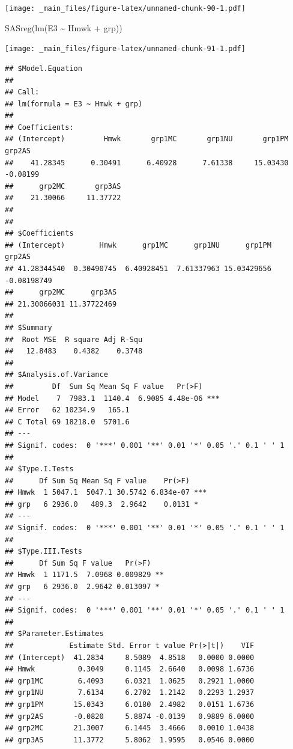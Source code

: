 \documentclass[
]{book}
\newenvironment{Shaded}{\begin{snugshade}}{\end{snugshade}}
\newcommand{\FunctionTok}[1]{\textcolor[rgb]{0.00,0.00,0.00}{#1}}
\newcommand{\NormalTok}[1]{#1}
\newcommand{\SpecialCharTok}[1]{\textcolor[rgb]{0.00,0.00,0.00}{#1}}
\begin{document}
\texttt{[image: \_main\_files/figure-latex/unnamed-chunk-90-1.pdf]}

\begin{Shaded}
\begin{Highlighting}[]
\FunctionTok{SASreg}\NormalTok{(}\FunctionTok{lm}\NormalTok{(E3 }\SpecialCharTok{\textasciitilde{}}\NormalTok{ Hmwk }\SpecialCharTok{+}\NormalTok{ grp))}
\end{Highlighting}
\end{Shaded}

\texttt{[image: \_main\_files/figure-latex/unnamed-chunk-91-1.pdf]}

\begin{verbatim}
## $Model.Equation
## 
## Call:
## lm(formula = E3 ~ Hmwk + grp)
## 
## Coefficients:
## (Intercept)         Hmwk       grp1MC       grp1NU       grp1PM       grp2AS  
##    41.28345      0.30491      6.40928      7.61338     15.03430     -0.08199  
##      grp2MC       grp3AS  
##    21.30066     11.37722  
## 
## 
## $Coefficients
## (Intercept)        Hmwk      grp1MC      grp1NU      grp1PM      grp2AS 
## 41.28344540  0.30490745  6.40928451  7.61337963 15.03429656 -0.08198749 
##      grp2MC      grp3AS 
## 21.30066031 11.37722469 
## 
## $Summary
##  Root MSE  R square Adj R-Squ 
##   12.8483    0.4382    0.3748 
## 
## $Analysis.of.Variance
##         Df  Sum Sq Mean Sq F value   Pr(>F)    
## Model    7  7983.1  1140.4  6.9085 4.48e-06 ***
## Error   62 10234.9   165.1                     
## C Total 69 18218.0  5701.6                     
## ---
## Signif. codes:  0 '***' 0.001 '**' 0.01 '*' 0.05 '.' 0.1 ' ' 1
## 
## $Type.I.Tests
##      Df Sum Sq Mean Sq F value    Pr(>F)    
## Hmwk  1 5047.1  5047.1 30.5742 6.834e-07 ***
## grp   6 2936.0   489.3  2.9642    0.0131 *  
## ---
## Signif. codes:  0 '***' 0.001 '**' 0.01 '*' 0.05 '.' 0.1 ' ' 1
## 
## $Type.III.Tests
##      Df Sum Sq F value   Pr(>F)   
## Hmwk  1 1171.5  7.0968 0.009829 **
## grp   6 2936.0  2.9642 0.013097 * 
## ---
## Signif. codes:  0 '***' 0.001 '**' 0.01 '*' 0.05 '.' 0.1 ' ' 1
## 
## $Parameter.Estimates
##             Estimate Std. Error t value Pr(>|t|)    VIF
## (Intercept)  41.2834     8.5089  4.8518   0.0000 0.0000
## Hmwk          0.3049     0.1145  2.6640   0.0098 1.6736
## grp1MC        6.4093     6.0321  1.0625   0.2921 1.0000
## grp1NU        7.6134     6.2702  1.2142   0.2293 1.2937
## grp1PM       15.0343     6.0180  2.4982   0.0151 1.6736
## grp2AS       -0.0820     5.8874 -0.0139   0.9889 6.0000
## grp2MC       21.3007     6.1445  3.4666   0.0010 1.0438
## grp3AS       11.3772     5.8062  1.9595   0.0546 0.0000
\end{verbatim}
\end{document}
